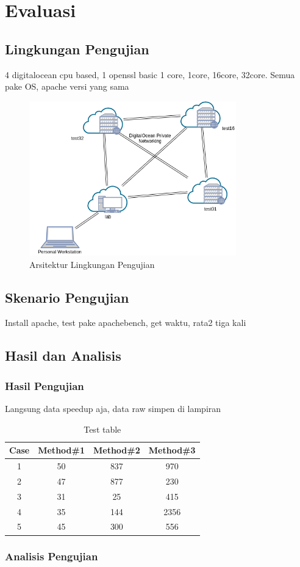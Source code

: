 
\section{Evaluasi}
\subsection{Lingkungan Pengujian}
4 digitalocean cpu based, 1 openssl basic 1 core, 1core, 16core, 32core. Semua pake OS, apache versi yang sama
\begin{figure}[h]
  \centering
  \includegraphics[width=0.8\textwidth]{resources/ch-4/testing_arch.png}
  \caption{Arsitektur Lingkungan Pengujian}
  \label{fig:testing_arch}
\end{figure}

\subsection{Skenario Pengujian}
Install apache, test pake apachebench, get waktu, rata2 tiga kali
\subsection{Hasil dan Analisis}
\subsubsection{Hasil Pengujian}
  Langsung data speedup aja, data raw simpen di lampiran

  \begin{table}[ht]
  \caption{Test table} %
  \centering %
  \begin{tabular}{c c c c} %
  \hline\hline %
  Case & Method\#1 & Method\#2 & Method\#3 \\ [0.5ex] %
  \hline %
  1 & 50 & 837 & 970 \\ %
  2 & 47 & 877 & 230 \\
  3 & 31 & 25 & 415 \\
  4 & 35 & 144 & 2356 \\
  5 & 45 & 300 & 556 \\ [1ex] %
  \hline %
  \end{tabular}
  \label{table:nonlin} %
  \end{table}

\subsubsection{Analisis Pengujian}
